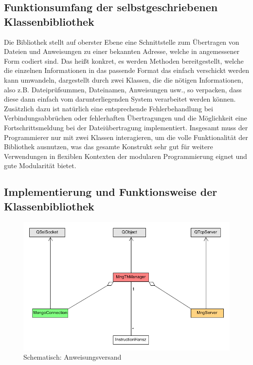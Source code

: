 \subsection{Funktionsumfang der selbstgeschriebenen Klassenbibliothek}
Die Bibliothek stellt auf oberster Ebene eine Schnittstelle zum Übertragen von Dateien und Anweisungen zu einer bekannten Adresse, welche in angemessener Form codiert sind.
Das heißt konkret, es werden Methoden bereitgestellt, welche die einzelnen Informationen in das passende Format das einfach verschickt werden kann umwandeln, dargestellt durch zwei Klassen, die die nötigen Informationen, also z.B. Dateiprüfsummen, Dateinamen, Anweisungen usw., so verpacken, dass diese dann einfach vom darunterliegenden System verarbeitet werden können.
Zusätzlich dazu ist natürlich eine entsprechende Fehlerbehandlung bei Verbindungsabbrüchen oder fehlerhaften Übertragungen und die Möglichkeit eine Fortschrittsmeldung bei der Dateiübertragung implementiert.
Insgesamt muss der Programmierer nur mit zwei Klassen interagieren, um die volle Funktionalität der Bibliothek ausnutzen, was das gesamte Konstrukt sehr gut für weitere Verwendungen in flexiblen Kontexten der modularen Programmierung eignet und gute Modularität bietet.

\subsection{Implementierung und Funktionsweise der Klassenbibliothek}
\begin{figure}
\includegraphics[scale=.3]{classDiagInstr}
\caption{Schematisch: Anweisungsversand}
\label{inst_d}
\end{figure}

